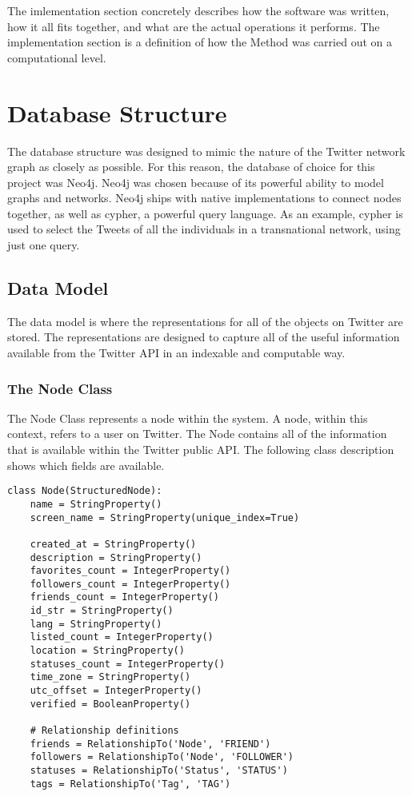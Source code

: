 The imlementation section concretely describes how the software was
written, how it all fits together, and what are the actual operations
it performs. The implementation section is a definition of how the
Method was carried out on a computational level.

\section{Database Structure}
The database structure was designed to mimic the nature of the Twitter
network graph as closely as possible. For this reason, the database of
choice for this project was Neo4j. Neo4j was chosen because of its
powerful ability to model graphs and networks. Neo4j ships with native
implementations to connect nodes together, as well as cypher, a
powerful query language. As an example, cypher is used to select the
Tweets of all the individuals in a transnational network, using just
one query.

\subsection{Data Model}
The data model is where the representations for all of the objects on
Twitter are stored. The representations are designed to capture all of
the useful information available from the Twitter API in an indexable
and computable way.

\subsubsection{The Node Class}
The Node Class represents a node within the system. A node, within
this context, refers to a user on Twitter. The Node contains all of
the information that is available within the Twitter public API. The
following class description shows which fields are available.

\begin{lstlisting}
class Node(StructuredNode):
    name = StringProperty()
    screen_name = StringProperty(unique_index=True)
    
    created_at = StringProperty()
    description = StringProperty()
    favorites_count = IntegerProperty()
    followers_count = IntegerProperty()
    friends_count = IntegerProperty()
    id_str = StringProperty()
    lang = StringProperty()
    listed_count = IntegerProperty()
    location = StringProperty()
    statuses_count = IntegerProperty()
    time_zone = StringProperty()
    utc_offset = IntegerProperty()
    verified = BooleanProperty()
    
    # Relationship definitions
    friends = RelationshipTo('Node', 'FRIEND')
    followers = RelationshipTo('Node', 'FOLLOWER')
    statuses = RelationshipTo('Status', 'STATUS')
    tags = RelationshipTo('Tag', 'TAG')
\end{lstlisting}

